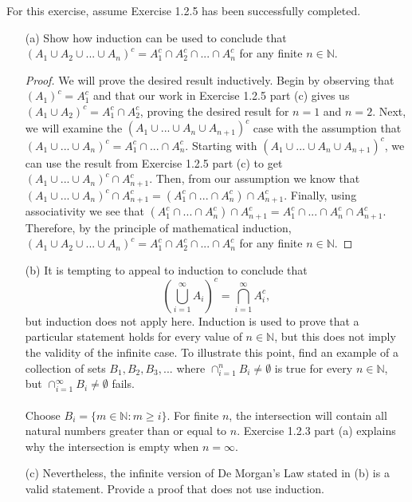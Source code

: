 \documentclass[11pt]{article}
\def\N{{\mathbb{N}}}
\newenvironment{exer}[1]
    {\renewcommand\theinnercustomexer{#1}\innercustomexer\upshape}
    {\endinnercustomexer}
\begin{document}
\begin{exer}{1.2.13}
    For this exercise, assume Exercise 1.2.5 has been successfully completed.
    \begin{enumerate}
        \item[(a)]
            Show how induction can be used to conclude that $(A_1\cup A_2\cup ...\cup A_n)^c=A_1^c\cap A_2^c\cap ...\cap A_n^c$ for any finite $n\in\N$.
            \begin{proof}
                We will prove the desired result inductively. Begin by observing that $(A_1)^c=A_1^c$ and that our work in Exercise 1.2.5 part (c) gives us $(A_1\cup A_2)^c=A_1^c\cap A_2^c$, proving the desired result for $n=1$ and $n=2$. Next, we will examine the $(A_1\cup ...\cup A_n\cup A_{n+1})^c$ case with the assumption that $(A_1\cup ...\cup A_n)^c=A_1^c\cap ...\cap A_n^c$. Starting with $(A_1\cup ...\cup A_n\cup A_{n+1})^c$, we can use the result from Exercise 1.2.5 part (c) to get $(A_1\cup ...\cup A_n)^c\cap A_{n+1}^c$. Then, from our assumption we know that $(A_1\cup ...\cup A_n)^c\cap A_{n+1}^c=(A_1^c\cap ...\cap A_n^c)\cap A_{n+1}^c$. Finally, using associativity we see that $(A_1^c\cap ...\cap A_n^c)\cap A_{n+1}^c=A_1^c\cap ...\cap A_n^c\cap A_{n+1}^c$. Therefore, by the principle of mathematical induction, $(A_1\cup A_2\cup ...\cup A_n)^c=A_1^c\cap A_2^c\cap ...\cap A_n^c$ for any finite $n\in\N$.
            \end{proof}
        \item[(b)]
            It is tempting to appeal to induction to conclude that
            \begin{equation*}
                \left(\bigcup_{i=1}^\infty A_i\right)^c=\bigcap_{i=1}^\infty A_i^c,
            \end{equation*}
            but induction does not apply here. Induction is used to prove that a particular statement holds for every value of $n\in\N$, but this does not imply the validity of the infinite case. To illustrate this point, find an example of a collection of sets $B_1, B_2, B_3,...$ where $\cap_{i=1}^nB_i\neq\emptyset$ is true for every $n\in\N$, but $\cap_{i=1}^\infty B_i\neq\emptyset$ fails. \\ \\
            Choose $B_i=\{m\in\N:m\geq i\}$. For finite $n$, the intersection will contain all natural numbers greater than or equal to $n$. Exercise 1.2.3 part (a) explains why the intersection is empty when $n=\infty$.
        \item[(c)]
            Nevertheless, the infinite version of De Morgan's Law stated in (b) is a valid statement. Provide a proof that does not use induction.

\end{enumerate}
\end{exer}
\end{document}
